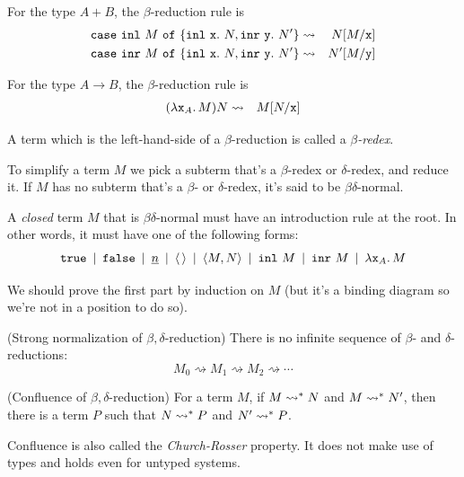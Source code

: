 \documentclass[runningheads,12pt]{llncs}
\begin{document}
For the type $A + B$, the $\beta$-reduction rule is
\begin{eqnarray*}
  \mathtt{case} \  \mathtt{inl} \  {M} \ \mathtt{of}\  \{ \mathtt{inl} \  {\mathtt{x}} . \  N, \mathtt{inr} \  {\mathtt{y}} . \  N' \} & \rightsquigarrow & N[M/\mathtt{x}] \\
  \mathtt{case} \  \mathtt{inr} \  {M} \ \mathtt{of}\  \{ \mathtt{inl} \  {\mathtt{x}} . \  N, \mathtt{inr} \  {\mathtt{y}} . \  N' \} & \rightsquigarrow & N'[M/\mathtt{y}] \\
\end{eqnarray*}

For the type $A \rightarrow B$, the $\beta$-reduction rule is 
\begin{eqnarray*}
  (\lambda \mathtt{x}_{A}.\, M) N & \rightsquigarrow & M[N/\mathtt{x}]
\end{eqnarray*}

A term which is the left-hand-side of a $\beta$-reduction is called a \emph{$\beta$-redex}.

To simplify a term $M$ we pick a subterm that's a $\beta$-redex or $\delta$-redex, and reduce it.  If $M$ has no subterm that's a $\beta$- or $\delta$-redex, it's said to be $\beta\delta$-normal.

\begin{proposition}
  A \emph{closed} term $M$ that is $\beta\delta$-normal must have an introduction rule at the root. In other words, it must have one of the following forms:
  \begin{displaymath}
    \mathtt{true} \hspace{0.5em} | \hspace{0.5em} \mathtt{false} \hspace{0.5em} | \hspace{0.5em} \underline{n} \hspace{0.5em} | \hspace{0.5em} \langle {\,} \rangle \hspace{0.5em} | \hspace{0.5em} \langle {M,N} \rangle \hspace{0.5em} | \hspace{0.5em} \mathtt{inl} \  M \hspace{0.5em} | \hspace{0.5em} \mathtt{inr} \  M \hspace{0.5em} | \hspace{0.5em} \lambda \mathtt{x}_{A}.\, M 
  \end{displaymath} 
\end{proposition}
We should prove the first part by induction on $M$ (but it's a binding diagram so we're not in a position to do so).

\begin{proposition}(Strong normalization of $\beta,\delta$-reduction)  \hfill
There is no infinite sequence of $\beta$- and $\delta$-reductions:
  \begin{displaymath}
    M_0 \rightsquigarrow M_1 \rightsquigarrow M_2 \rightsquigarrow \cdots
  \end{displaymath}  
\end{proposition}

\begin{proposition}(Confluence of $\beta,\delta$-reduction)\label{prop:confluence}  \hfill
For a term $M$, if $M \rightsquigarrow^{*} N$ and $M \rightsquigarrow^{*} N'$, then there is a term $P$ such that $N \rightsquigarrow^{*} P$ and $N' \rightsquigarrow^{*} P$.
\end{proposition}
Confluence is also called the \emph{Church-Rosser} property.  It does not make use of types and holds even for untyped systems.
\end{document}
